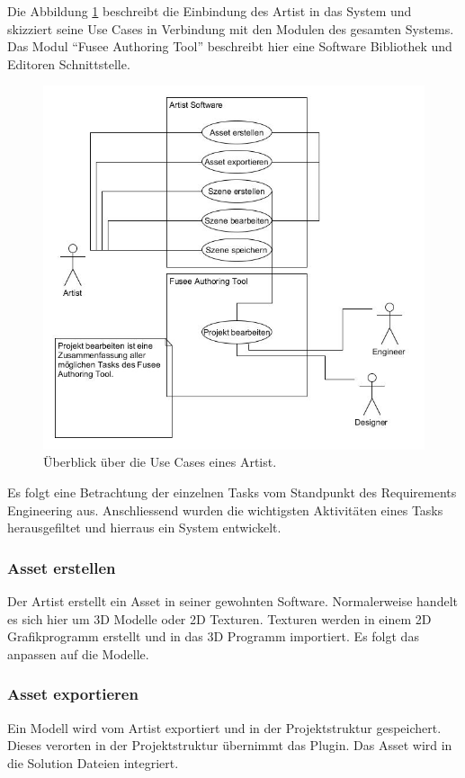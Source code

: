 \documentclass[pagesize, paper=a4, fontsize=12pt, titlepage=true, headings=small, headnosepline, abstractoff, liststotoc, nochapterprefix, plainheadsepline, twoside]{scrreprt}
\begin{document}
Die Abbildung \ref{UseCaseArtist} beschreibt die Einbindung des Artist in das System und skizziert seine Use Cases in Verbindung mit den Modulen des gesamten Systems. Das Modul “Fusee Authoring Tool” beschreibt hier eine Software Bibliothek und Editoren Schnittstelle.
\begin{figure}[ht]
	\centering
	\includegraphics[width=\linewidth]{Bilder/UseCase_Artist.jpg}
	\caption{Überblick über die Use Cases eines Artist.}
	\label{UseCaseArtist}
\end{figure}

Es folgt eine Betrachtung der einzelnen Tasks vom Standpunkt des Requirements Engineering aus. Anschliessend wurden die wichtigsten Aktivitäten eines Tasks herausgefiltet und hierraus ein System entwickelt.

\subsubsection{Asset erstellen}
Der Artist erstellt ein Asset in seiner gewohnten Software. Normalerweise handelt es sich hier um 3D Modelle oder 2D Texturen. Texturen werden in einem 2D Grafikprogramm erstellt und  in das 3D Programm importiert. Es folgt das anpassen auf die Modelle.

\subsubsection{Asset exportieren}
Ein Modell wird vom Artist exportiert und in der Projektstruktur gespeichert. Dieses verorten in der Projektstruktur übernimmt das Plugin. Das Asset wird in die Solution Dateien integriert.
\end{document}
